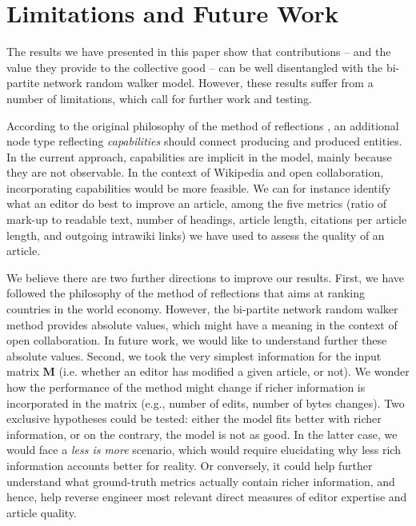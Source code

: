 \section{Limitations and Future Work}
The results we have presented in this paper show that contributions -- and the value they provide to the collective good -- can be well disentangled with the {bi-partite network random walker} model. However, these results suffer from a number of limitations, which call for further work and testing. 


According to the original philosophy of the method of reflections \cite{hidalgo2007}, an additional node type reflecting {\it capabilities} should connect producing and produced entities. In the current approach, capabilities are implicit in the model, mainly because they are not observable. In the context of Wikipedia and open collaboration, incorporating capabilities would be more feasible. We can for instance identify what an editor do best to improve an article, among the five metrics (ratio of mark-up to readable text, number of headings, article length, citations per article length, and outgoing intrawiki links) we have used to assess the quality of an article.

We believe there are two further directions to improve our results. First, we have followed the philosophy of the method of reflections that aims at ranking countries in the world economy. However, the bi-partite network random walker method provides absolute values, which might have a meaning in the context of open collaboration. In future work, we would like to understand further these absolute values. Second, we took the very simplest information for the input matrix $\mathbf{M}$ (i.e. whether an editor has modified a given article, or not). We wonder how the performance of the method might change if richer information is incorporated in the matrix (e.g., number of edits, number of bytes changes). Two exclusive hypotheses could be tested: either the model fits better with richer information, or on the contrary, the model is not as good. In the latter case, we would face a {\it less is more} scenario, which would require elucidating why less rich information accounts better for reality. Or conversely, it could help further understand what ground-truth metrics actually contain richer information, and hence, help reverse engineer most relevant direct measures of editor expertise and article quality.

